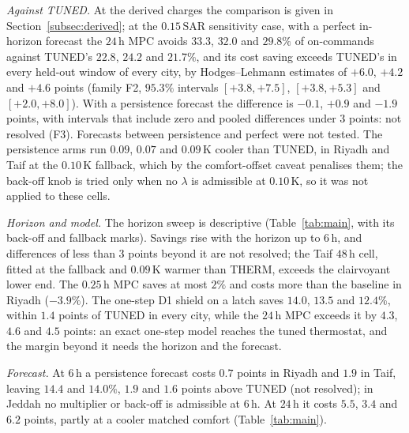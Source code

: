 \documentclass[3p,twocolumn,number]{elsarticle}
\newcommand{\SAR}{\text{SAR}}
\begin{document}


\emph{Against TUNED.} At the derived charges the comparison is given in Section~\ref{subsec:derived}; at the $0.15\,\SAR$ sensitivity case, with a perfect in-horizon forecast the $24\,$h MPC avoids $33.3$, $32.0$ and $29.8\%$ of on-commands against TUNED's $22.8$, $24.2$ and $21.7\%$, and its cost saving exceeds TUNED's in every held-out window of every city, by Hodges--Lehmann estimates of $+6.0$, $+4.2$ and $+4.6$ points (family F2, $95.3\%$ intervals $[+3.8,+7.5]$, $[+3.8,+5.3]$ and $[+2.0,+8.0]$). With a persistence forecast the difference is $-0.1$, $+0.9$ and $-1.9$ points, with intervals that include zero and pooled differences under $3$ points: not resolved (F3). Forecasts between persistence and perfect were not tested. The persistence arms run $0.09$, $0.07$ and $0.09\,$K cooler than TUNED, in Riyadh and Taif at the $0.10\,$K fallback, which by the comfort-offset caveat penalises them; the back-off knob is tried only when no $\lambda$ is admissible at $0.10\,$K, so it was not applied to these cells.

\emph{Horizon and model.} The horizon sweep is descriptive (Table~\ref{tab:main}, with its back-off and fallback marks). Savings rise with the horizon up to $6\,$h, and differences of less than $3$ points beyond it are not resolved; the Taif $48\,$h cell, fitted at the fallback and $0.09\,$K warmer than THERM, exceeds the clairvoyant lower end. The $0.25\,$h MPC saves at most $2\%$ and costs more than the baseline in Riyadh ($-3.9\%$). The one-step D1 shield on a latch saves $14.0$, $13.5$ and $12.4\%$, within $1.4$ points of TUNED in every city, while the $24\,$h MPC exceeds it by $4.3$, $4.6$ and $4.5$ points: an exact one-step model reaches the tuned thermostat, and the margin beyond it needs the horizon and the forecast.

\emph{Forecast.} At $6\,$h a persistence forecast costs $0.7$ points in Riyadh and $1.9$ in Taif, leaving $14.4$ and $14.0\%$, $1.9$ and $1.6$ points above TUNED (not resolved); in Jeddah no multiplier or back-off is admissible at $6\,$h. At $24\,$h it costs $5.5$, $3.4$ and $6.2$ points, partly at a cooler matched comfort (Table~\ref{tab:main}).
\end{document}

